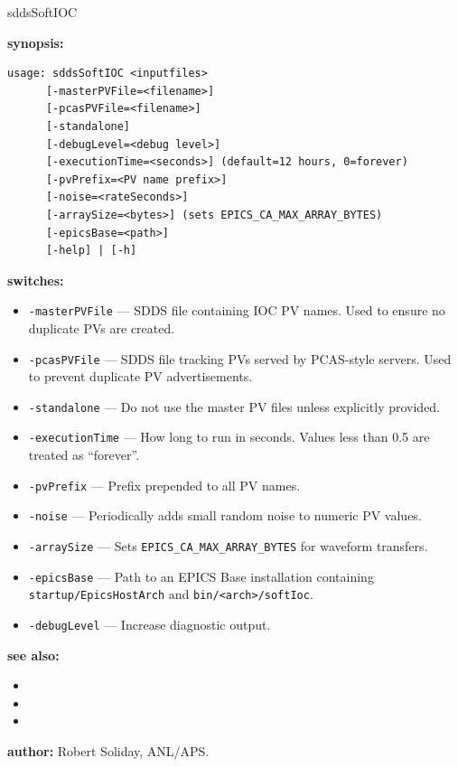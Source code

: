 \begin{sddsprog}{sddsSoftIOC}
\item \textbf{synopsis:}
\begin{verbatim}
usage: sddsSoftIOC <inputfiles>
      [-masterPVFile=<filename>]
      [-pcasPVFile=<filename>]
      [-standalone]
      [-debugLevel=<debug level>]
      [-executionTime=<seconds>] (default=12 hours, 0=forever)
      [-pvPrefix=<PV name prefix>]
      [-noise=<rateSeconds>]
      [-arraySize=<bytes>] (sets EPICS_CA_MAX_ARRAY_BYTES)
      [-epicsBase=<path>]
      [-help] | [-h]
\end{verbatim}

\item \textbf{switches:}
\begin{itemize}
  \item {\tt -masterPVFile} --- SDDS file containing IOC PV names. Used to ensure no duplicate PVs are created.
  \item {\tt -pcasPVFile} --- SDDS file tracking PVs served by PCAS-style servers. Used to prevent duplicate PV advertisements.
  \item {\tt -standalone} --- Do not use the master PV files unless explicitly provided.
  \item {\tt -executionTime} --- How long to run in seconds. Values less than 0.5 are treated as ``forever''.
  \item {\tt -pvPrefix} --- Prefix prepended to all PV names.
  \item {\tt -noise} --- Periodically adds small random noise to numeric PV values.
  \item {\tt -arraySize} --- Sets \verb+EPICS_CA_MAX_ARRAY_BYTES+ for waveform transfers.
  \item {\tt -epicsBase} --- Path to an EPICS Base installation containing \verb+startup/EpicsHostArch+ and \verb+bin/<arch>/softIoc+.
  \item {\tt -debugLevel} --- Increase diagnostic output.
\end{itemize}

\item \textbf{see also:}
\begin{itemize}
  \item {}
  \item {}
  \item {}
\end{itemize}

\item \textbf{author:} Robert Soliday, ANL/APS.
\end{sddsprog}
